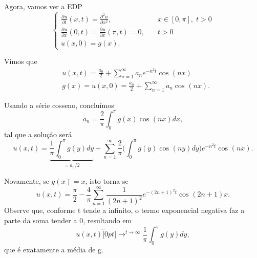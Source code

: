 \documentclass[../pde_notes.tex]{subfiles}
\begin{document}
\begin{example}
	Agora, vamos ver a EDP
	\[
		\left\{\begin{array}{ll}
			\frac{\partial^{}u}{\partial t^{}}(x, t) = \frac{\partial^{2}u}{\partial x^{2}},            & \quad x\in[0, \pi ],\; t>0 \\
			\frac{\partial^{}u}{\partial x^{}}(0, t) = \frac{\partial^{}u}{\partial x^{}}(\pi , t) = 0, & \quad t>0                  \\
			u(x, 0) = g(x).
		\end{array}\right.
	\]

	Vimos que
	\begin{align*}
		 & u(x, t) = \frac{a_{0}}{2} + \sum\limits_{n=1}^{\infty}a_{n}e^{-n^{2}t}\cos^{}{(nx)} \\
		 & g(x) = u(x, 0) = \frac{a_{0}}{2}+\sum\limits_{n=1}^{\infty}a_{n}\cos^{}{(nx)}.
	\end{align*}

	Usando a série cosseno, concluímos
	\[
		a_{n} = \frac{2}{\pi }\int_{0}^{\pi }g(x)\cos^{}{(nx)}dx,
	\]
	tal que a solução será
	\[
		u(x, t) = \underbrace{\frac{1}{\pi }\int_{0}^{\pi }g(y)dy}_{=a_{0}/2} + \sum\limits_{n=1}^{\infty}\frac{2}{\pi }\biggl(\int_{0}^{\pi }g(y)\cos^{}{(ny)}dy\biggr)e^{-n^{2}t}\cos^{}{(nx)}.
	\]

	Novamente, se \(g(x)=x\), isto torna-se
	\[
		u(x, t) = \frac{\pi }{2}-\frac{4}{\pi }\sum\limits_{n=1}^{\infty}\frac{1}{(2n+1)^{2}}e^{-(2n+1)^{2}t}\cos^{}{(2n+1)x}.
	\]
	Observe que, conforme t tende a infinito, o termo exponencial negativa faz a parte da soma tender a 0, resultando em
	\[
		u(x,t)\overbracket[0pt]{\longrightarrow}^{t\to \infty} \frac{1}{\pi }\int_{0}^{\pi }g(y)dy,
	\]
	que é exatamente a média de g.
\end{example}
\end{document}
